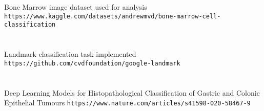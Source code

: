 \documentclass[%
 reprint,
 amsmath,amssymb,
 aps,
]{revtex4-1}
\begin{document}
\begin{thebibliography}{2}
	
	Bone Marrow image dataset used for analysis
	\texttt{https://www.kaggle.com/datasets/andrewmvd/bone-marrow-cell-classification}\\
	\\
	\\
	
	Landmark classification task implemented
	\texttt{https://github.com/cvdfoundation/google-landmark}\\
	\\
	\\
	
	Deep Learning Models for Histopathological Classification of Gastric and Colonic Epithelial Tumours
	\texttt{https://www.nature.com/articles/s41598-020-58467-9}\\
	

\end{thebibliography}

\end{document}
